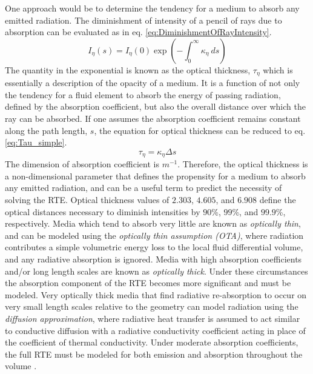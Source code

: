 One approach would be to determine the tendency for a medium to absorb any emitted radiation. The diminishment of intensity of a pencil of rays due to absorption can be evaluated as in eq. \ref{eq:DiminishmentOfRayIntensity}.
\begin{equation}
    I_\eta{}(s)=I_\eta{}(0)\exp{\left(-\int^\infty_0{\kappa{}_\eta{}~ds}\right)}
    \label{eq:DiminishmentOfRayIntensity}
\end{equation}
The quantity in the exponential is known as the optical thickness, $\tau{}_\eta{}$ which is essentially a description of the opacity of a medium. It is a function of not only the tendency for a fluid element to absorb the energy of passing radiation, defined by the absorption coefficient, but also the overall distance over which the ray can be absorbed.
If one assumes the absorption coefficient remains constant along the path length, $s$, the equation for optical thickness can be reduced to eq. \ref{eq:Tau_simple}.
\begin{equation}
    \tau{}_\eta = \kappa{}_\eta{}\Delta{s}
    \label{eq:Tau_simple}
\end{equation}
The dimension of absorption coefficient is $m^{-1}$. Therefore, the optical thickness is a non-dimensional parameter that defines the propensity for a medium to absorb any emitted radiation, and can be a useful term to predict the necessity of solving the RTE. 
Optical thickness values of $2.303$, $4.605$, and $6.908$ define the optical distances necessary to diminish intensities by $90$\%, $99$\%, and $99.9$\%, respectively.
Media which tend to absorb very little are known as \textit{optically thin}, and can be modeled using the \textit{optically thin assumption (OTA)}, where radiation contributes a simple volumetric energy loss to the local fluid differential volume, and any radiative absorption is ignored.
Media with high absorption coefficients and/or long length scales are known as \textit{optically thick}. Under these circumstances the absorption component of the RTE becomes more significant and must be modeled.
Very optically thick media that find radiative re-absorption to occur on very small length scales relative to the geometry can model radiation using the \textit{diffusion approximation}, where radiative heat transfer is assumed to act similar to conductive diffusion with a radiative conductivity coefficient acting in place of the coefficient of thermal conductivity. 
Under moderate absorption coefficients, the full RTE must be modeled for both emission and absorption throughout the volume \cite{Modest2013RadiativeTransfer}.

